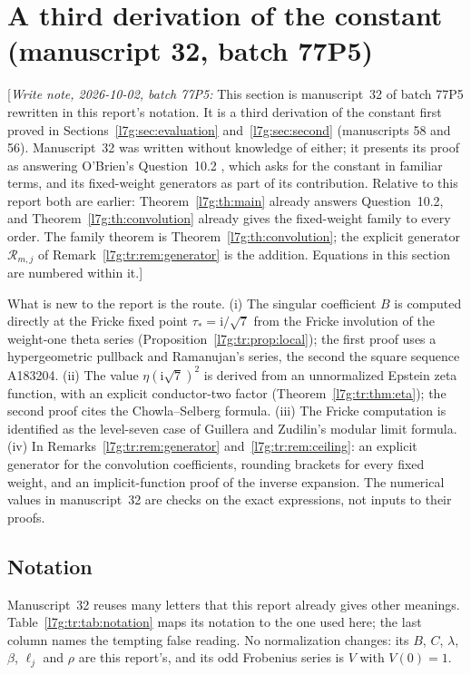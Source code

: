 \documentclass[11pt,letterpaper]{article}
\theoremstyle{remark}\newtheorem{remark}[theorem]{Remark}
\newcommand{\ii}{\mathrm i}\newcommand{\ee}{\mathrm e}
\newcommand{\writenote}[1]{\textup{[}\emph{Write note, 2026-10-02, batch 77P5:} #1\textup{]}}
\newcounter{l7gtrsavedeq}
\begin{document}
\section{A third derivation of the constant (manuscript 32, batch 77P5)}\label{l7g:tr:sec:third}
\setcounter{l7gtrsavedeq}{\value{equation}}\setcounter{equation}{0}
\renewcommand{\theequation}{\thesection.\arabic{equation}}
\renewcommand{\theHequation}{l7gtr.\arabic{equation}}

\writenote{This section is manuscript~32 of batch 77P5 rewritten in this
report's notation. It is a third derivation of the constant first proved in
Sections~\ref{l7g:sec:evaluation} and~\ref{l7g:sec:second} (manuscripts 58
and 56). Manuscript~32 was written without knowledge of either; it presents
its proof as answering O'Brien's Question~10.2 \cite{l7g:obrien}, which
asks for the constant in familiar terms, and its fixed-weight generators as
part of its contribution. Relative to this report both are earlier:
Theorem~\ref{l7g:th:main} already answers Question~10.2, and
Theorem~\ref{l7g:th:convolution} already gives the fixed-weight family to
every order. The family theorem is Theorem~\ref{l7g:th:convolution}; the
explicit generator $\mathcal R_{m,j}$ of Remark~\ref{l7g:tr:rem:generator}
is the addition. Equations in this section are numbered within it.}

What is new to the report is the route. (i) The singular coefficient $B$
is computed directly at the Fricke fixed point $\tau_*=\ii/\sqrt7$ from the
Fricke involution of the weight-one theta series
(Proposition~\ref{l7g:tr:prop:local}); the first proof uses a
hypergeometric pullback and Ramanujan's series, the second the square
sequence A183204. (ii) The value $\eta(\ii\sqrt7)^2$ is derived from an
unnormalized Epstein zeta function, with an explicit conductor-two factor
(Theorem~\ref{l7g:tr:thm:eta}); the second proof cites the Chowla--Selberg
formula. (iii) The Fricke computation is identified as the level-seven
case of Guillera and Zudilin's modular limit formula. (iv) In
Remarks~\ref{l7g:tr:rem:generator} and~\ref{l7g:tr:rem:ceiling}: an explicit
generator for the convolution coefficients, rounding brackets for every
fixed weight, and an implicit-function proof of the inverse expansion. The
numerical values in manuscript~32 are checks on the exact expressions, not
inputs to their proofs.

\subsection{Notation}\label{l7g:tr:sec:notation}
Manuscript~32 reuses many letters that this report already gives other
meanings. Table~\ref{l7g:tr:tab:notation} maps its notation to the one used
here; the last column names the tempting false reading. No normalization
changes: its $B$, $C$, $\lambda$, $\beta$, $\ell_j$ and $\rho$ are this
report's, and its odd Frobenius series is $V$ with $V(0)=1$.
\end{document}

